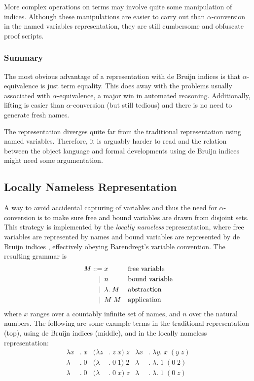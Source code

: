 \documentclass[a4paper,11pt]{article}
\begin{document}
More complex operations on terms may involve quite some
manipulation of indices.
Although these manipulations are easier to carry out than
$\alpha$-conversion in the named variables representation, they
are still cumbersome and obfuscate proof scripts.

\subsubsection*{Summary}

The most obvious advantage of a representation with de Bruijn
indices is that $\alpha$-equivalence is just term equality.
This does away with the problems usually associated with
$\alpha$-equivalence, a major win in automated reasoning.
Additionally, lifting is easier than $\alpha$-conversion (but
still tedious) and there is no need to generate fresh names.

The representation diverges quite far from the traditional
representation using named variables.
Therefore, it is arguably harder to read and the relation
between the object language and formal developments using de
Bruijn indices might need some argumentation.


\subsection{Locally Nameless Representation}

A way to avoid accidental capturing of variables and thus the need for
$\alpha$-conversion is to make sure free and bound variables are drawn
from disjoint sets.
This strategy is implemented by the {\em locally nameless} representation,
where free variables are represented by names and bound variables are
represented by de Bruijn indices \cite{mcbride-mckinna-04}, effectively
obeying Barendregt's variable convention.
The resulting grammar is
\begin{align*}
  M ::=             &\; x
  && \text{free variable} \\
  \llap{\textbar\:} &\; n
  && \text{bound variable} \\
  \llap{\textbar\:} &\; \lambda . \; M
    && \text{abstraction} \\
  \llap{\textbar\:} &\; M \; M
  && \text{application}
\end{align*}
where $x$ ranges over a countably infinite set of names, and $n$ over
the natural numbers.
The following are some example terms in the traditional representation
(top), using de Bruijn indices (middle), and in the locally nameless
representation:
\begin{align*}
  \lambda x&. \; x & (\lambda z&. \; z \; x) \; z & \lambda x&. \; \lambda y. \; x \; (y \; z)\\
  \lambda &. \; 0  & (\lambda &. \; 0 \; 1) \; 2  & \lambda &. \; \lambda . \; 1 \; (0 \; 2)\\
  \lambda &. \; 0  & (\lambda &. \; 0 \; x) \; z  & \lambda &. \; \lambda . \; 1 \; (0 \; z)
\end{align*}
\end{document}
